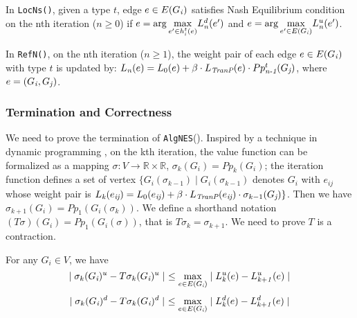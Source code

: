 \documentclass[10pt, conference, compsocconf]{IEEEtran}
\begin{document}
In \verb"LocNs()", given a type $t$, edge $e\in E(G_{\it i})$ satisfies Nash Equilibrium condition on the nth iteration ($n\geq 0$) if $e=\arg\underset{e'\in h_{\it i}^t(e)}{\max}L_{\it n}^d(e')$ and $e= \arg\underset{e'\in E(G_{\it i})}{\max}L_{\it n}^u(e')$.

In \verb"RefN()", on the nth iteration ($n\geq 1$), the weight pair of each edge $e\in E(G_{\it i})$ with type $t$ is updated by:
$L_{\it n}(e)=L_{0}(e)+\beta \cdot L_{\textit{TranP}}(e)\cdot Pp_{\textit{n-1}}^t(G_{\textit{j}})$, where $e=(G_{\it i},G_{\it j})$.

\subsubsection{Termination and Correctness}
We need to prove the termination of \verb"AlgNES"().
Inspired by a technique in dynamic programming \cite{vander}\cite{ls}, on the kth iteration, the value function can be formalized as a mapping $\sigma: V\rightarrow \mathds{R}\times \mathds{R}$, $\sigma_{k}(G_{\textit{i}})=Pp_{k}(G_{\textit{i}})$; the iteration function defines a set of vertex $\{G_{\textit{i}}(\sigma_{k-1})\mid G_{\textit{i}}(\sigma_{k-1})$ denotes $G_{\textit{i}}$ with $e_{\textit{ij}}$ whose weight pair is $L_{\it k}(e_{\textit{ij}})=L_{0}(e_{\textit{ij}})+ \beta\cdot L_{\textit{TranP}}(e_{\textit{ij}})\cdot \sigma_{k-1}(G_{\textit{j}})\}$.
Then we have $\sigma_{k+1}(G_{\textit{i}})=Pp_{1}(G_{i}(\sigma_{k}))$. We define a shorthand notation $(T\sigma)(G_{\textit{i}})=Pp_{1}(G_{i}(\sigma))$, that is $T\sigma_{k}=\sigma_{k+1}$. We need to prove $T$ is a contraction.
\begin{Lemma}
\label{provenesterminatedpre}
For any $G_{\textit{i}}\in V$, we have
$$\mid \sigma_{k}(G_{\textit{i}})^u- T\sigma_{k}(G_{\textit{i}})^u\mid~ \leq \underset{e\in E(G_{\textit{i}})}{\max} \mid L_{\it k}^u(e)- L_{\it k+1}^u(e)\mid$$
$$\mid \sigma_{k}(G_{\textit{i}})^d- T\sigma_{k}(G_{\textit{i}})^d\mid ~\leq \underset{e\in E(G_{\textit{i}})}{\max} \mid L_{\it k}^d(e)- L_{\it k+1}^d(e)\mid$$
\end{Lemma}
\end{document}
